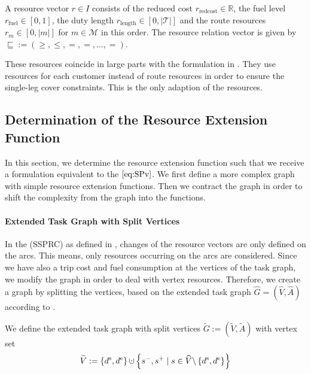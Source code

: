 A resource vector $r\in I$ consists of the reduced cost ${r_{\operatorname{redcost}}\in\mathbb{R}}$, the fuel level ${r_{\operatorname{fuel}}\in[0,1]}$, the duty length ${r_{\operatorname{length}}\in[0,|\mathcal{T}|]}$ and the route resources ${r_m\in[0,|m|]}$ for $m\in\mathcal{M}$ in this order. The resource relation vector is given by ${\sqsubseteq := \left(\geq,\leq,=,=,\dots,=\right)}$.

These resources coincide in large parts with the formulation in \cite{Kaiser}. They use resources for each customer instead of route resources in order to ensure the single-leg cover constraints. This is the only adaption of the resources.


\subsection{Determination of the Resource Extension Function}
\label{sec:ref}

In this section, we determine the resource extension function such that we receive a formulation equivalent to the $\eqref{eq:SPv}$. We first define a more complex graph with simple resource extension functions. Then we contract the graph in order to shift the complexity from the graph into the functions.

\paragraph{Extended Task Graph with Split Vertices} \parfill

In the (SSPRC) as defined in , changes of the resource vectors are only defined on the arcs. This means, only resources occurring on the arcs are considered. Since we have also a trip cost and fuel consumption at the vertices of the task graph, we modify the graph in order to deal with vertex resources. Therefore, we create a graph by splitting the vertices, based on the extended task graph $\widehat{G}=\left(\widehat{V},\widehat{A}\right)$ according to . 

We define the extended task graph with split vertices ${\widetilde{G} := \left(\widetilde{V},\widetilde{A}\right)}$ with vertex set
\begin{align*}
	\widetilde{V} := \left\{\ds,\de\right\}\cupdot\left\{s^-,s^+\mid s\in\widehat{V}\backslash\left\{\ds,\de\right\}\right\}
\end{align*}


